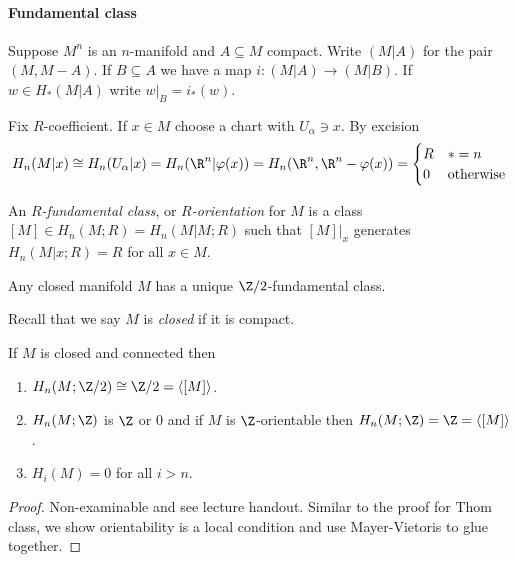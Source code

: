 \documentclass[a4paper]{article}
\begin{document}
\paragraph{Fundamental class}

\begin{notation}
  Suppose \(M^n\) is an \(n\)-manifold and \(A \subseteq M\) compact. Write \((M|A)\) for the pair \((M, M - A)\). If \(B \subseteq A\) we have a map \(i: (M|A) \to (M|B)\). If \(w \in H_*(M|A)\) write \(w|_B = i_*(w)\).
\end{notation}

Fix \(R\)-coefficient. If \(x \in M\) choose a chart with \(U_\alpha \ni x\). By excision
\[
  H_n(M|x) \cong H_n(U_\alpha|x) = H_n(\R^n |\varphi(x)) = H_n(\R^n, \R^n - \varphi(x)) =
  \begin{cases}
    R & * = n \\
    0 & \text{otherwise}
  \end{cases}
\]

\begin{definition}
  An \emph{\(R\)-fundamental class}, or \emph{\(R\)-orientation} for \(M\) is a class \([M] \in H_n(M; R) = H_n(M|M; R)\) such that \([M]|_x\) generates \(H_n(M|x; R) = R\) for all \(x \in M\).
\end{definition}

\begin{theorem}
  Any closed manifold \(M\) has a unique \(\Z/2\)-fundamental class.
\end{theorem}

Recall that we say \(M\) is \emph{closed} if it is compact.

\begin{theorem}
  If \(M\) is closed and connected then
  \begin{enumerate}
  \item \(H_n(M; \Z/2) \cong \Z/2 = \langle [M] \rangle\).
  \item \(H_n(M; \Z)\) is \(\Z\) or \(0\) and if \(M\) is \(\Z\)-orientable then \(H_n(M; \Z) = \Z = \langle [M] \rangle\).
  \item \(H_i(M) = 0\) for all \(i > n\).
  \end{enumerate}
\end{theorem}

\begin{proof}
  Non-examinable and see lecture handout. Similar to the proof for Thom class, we show orientability is a local condition and use Mayer-Vietoris to glue together.
\end{proof}
\end{document}
